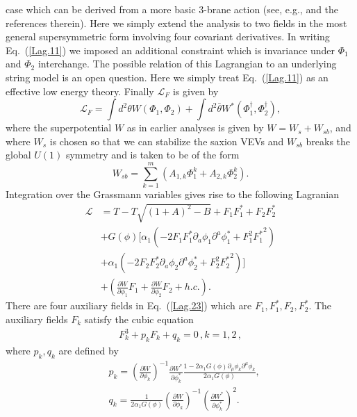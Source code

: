 \documentclass[12pt]{article}
\begin{document}
case which can be derived from a more basic 3-brane action
(see, e.g., \cite{Rocek:1997hi,Tseytlin:1999dj,Sasaki:2012ka} and the references
therein). Here we simply extend the analysis to two fields
in the most general supersymmetric form involving four covariant derivatives. In writing Eq.~(\ref{Lag.11}) we imposed
an additional constraint which is invariance under $\Phi_1$ and $\Phi_2$ interchange.
The possible relation of this Lagrangian
to an underlying string model is an open question. Here we simply treat Eq.~(\ref{Lag.11}) as an effective low energy
theory. Finally $\mathcal{L}_{F}$ is given by
\begin{equation}
  \mathcal{L}_{F}=\int d^2\theta W\left(\Phi_1,\Phi_2\right)+\int d^2\bar\theta
  W^* \left(\Phi_1^\dagger,\Phi_2^\dagger\right),
\end{equation}
where the superpotential $W$ as in earlier analyses   is given by  $W=W_s+W_{sb}$, and where
$W_s$ is chosen so that we can stabilize the saxion VEVs
and $W_{sb}$ breaks the global $U(1)$ symmetry and is taken to be of the form
\begin{equation}
  W_{sb}=\sum_{k=1}^m\left(A_{1, k}\Phi_1^k+A_{2, k}\Phi_2^k\right).
  \label{w3}
\end{equation}
Integration over the Grassmann variables gives rise to the following Lagranian\\
\begin{align}
  \mathcal{L}
   & =
  T - T \sqrt{(1+A)^2 - B}+ F_1 F^*_1 + F_2 F^*_2\nonumber\\
   & + G(\phi) \Big[ \alpha_1(-2 F_1 F^*_1 \partial_a\phi_1 \partial^a \phi^*_1
    + F_1^2 {F^*_1}^2)\nonumber\\
   & + \alpha_1 (-2 F_2 F^*_2 \partial_a\phi_2 \partial^a \phi^*_2
    + F_2^2 {F^*_2}^2)\Big]
  \nonumber\\
   & + \left(\frac{\partial W}{\partial \phi_1}F_1+ \frac{\partial W}{\partial \phi_2}F_2 + h.c.\right).
  \label{Lag.23}
\end{align}
There are four auxiliary fields in Eq.~(\ref{Lag.23}) which are $F_1, F^*_1, F_2, F^*_2$.
The auxiliary fields $F_k$ satisfy the cubic equation
\begin{align}
  F_k^3+ p_k F_k + q_k=0\,, k=1,2\,,
\end{align}
where $p_k, q_k$ are defined by
\begin{equation}\label{DisplayFormulaNumbered:eq.twoDBI.p.1}
  \begin{split}
    & p_k={\left(\frac{\partial W}{\partial \phi_k}\right)}^{-1}\frac{\partial W^*}{\partial \phi^*_k}\frac{1-2\alpha_1 G\left(\phi\right)\partial_\mu \phi_k\partial^\mu \phi_k}{2\alpha_1 G\left(\phi\right)}, \\
    & q_k=\frac{1}{2\alpha_1 G\left(\phi\right)}{\left(\frac{\partial W}{\partial \phi_k}\right)}^{-1}{\left(\frac{\partial W^*}{\partial \phi^*_k}\right)}^2. \\
  \end{split}
\end{equation}
\end{document}
